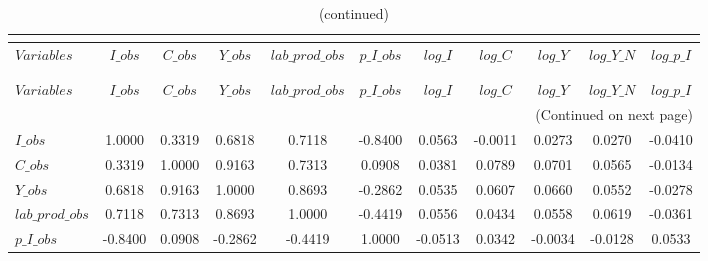  
\begin{center}
\begin{longtable}{lcccccccccc} 
\caption{MATRIX OF CORRELATIONS}\\
 \label{Table:th_corr_matrix}\\
\toprule 
$Variables       $	 & 	 $           I\_obs$	 & 	 $           C\_obs$	 & 	 $           Y\_obs$	 & 	 $  lab\_prod\_obs$	 & 	 $       p\_I\_obs$	 & 	 $           log\_I$	 & 	 $           log\_C$	 & 	 $           log\_Y$	 & 	 $       log\_Y\_N$	 & 	 $       log\_p\_I$\\
\midrule \endfirsthead 
\caption{(continued)}\\
 \toprule \\ 
$Variables       $	 & 	 $           I\_obs$	 & 	 $           C\_obs$	 & 	 $           Y\_obs$	 & 	 $  lab\_prod\_obs$	 & 	 $       p\_I\_obs$	 & 	 $           log\_I$	 & 	 $           log\_C$	 & 	 $           log\_Y$	 & 	 $       log\_Y\_N$	 & 	 $       log\_p\_I$\\
\midrule \endhead 
\midrule \multicolumn{11}{r}{(Continued on next page)} \\ \bottomrule \endfoot 
\bottomrule \endlastfoot 
$I\_obs          $	 & 	            1.0000	 & 	            0.3319	 & 	            0.6818	 & 	            0.7118	 & 	           -0.8400	 & 	            0.0563	 & 	           -0.0011	 & 	            0.0273	 & 	            0.0270	 & 	           -0.0410 \\ 
$C\_obs          $	 & 	            0.3319	 & 	            1.0000	 & 	            0.9163	 & 	            0.7313	 & 	            0.0908	 & 	            0.0381	 & 	            0.0789	 & 	            0.0701	 & 	            0.0565	 & 	           -0.0134 \\ 
$Y\_obs          $	 & 	            0.6818	 & 	            0.9163	 & 	            1.0000	 & 	            0.8693	 & 	           -0.2862	 & 	            0.0535	 & 	            0.0607	 & 	            0.0660	 & 	            0.0552	 & 	           -0.0278 \\ 
$lab\_prod\_obs  $	 & 	            0.7118	 & 	            0.7313	 & 	            0.8693	 & 	            1.0000	 & 	           -0.4419	 & 	            0.0556	 & 	            0.0434	 & 	            0.0558	 & 	            0.0619	 & 	           -0.0361 \\ 
$p\_I\_obs       $	 & 	           -0.8400	 & 	            0.0908	 & 	           -0.2862	 & 	           -0.4419	 & 	            1.0000	 & 	           -0.0513	 & 	            0.0342	 & 	           -0.0034	 & 	           -0.0128	 & 	            0.0533 \\ 

\end{longtable}
\end{center}
